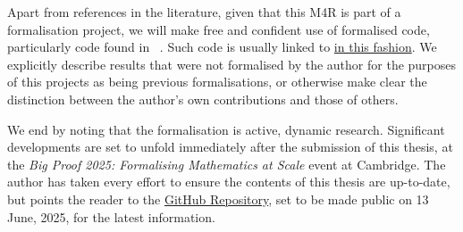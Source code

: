 Apart from references in the literature, given that this M4R is part of a formalisation project, we will make free and confident use of formalised code, particularly code found in \mathlib\ \cite{mathlib}. Such code is usually linked to \href{https://github.com/leanprover-community/mathlib4}{in this fashion}. We explicitly describe results that were not formalised by the author for the purposes of this projects as being previous formalisations, or otherwise make clear the distinction between the author's own contributions and those of others.

We end by noting that the formalisation is active, dynamic research. Significant developments are set to unfold immediately after the submission of this thesis, at the \textit{Big Proof 2025: Formalising Mathematics at Scale} event at Cambridge. The author has taken every effort to ensure the contents of this thesis are up-to-date, but points the reader to the \href{https://github.com/thefundamentaltheor3m/Sphere-Packing-Lean}{GitHub Repository}, set to be made public on 13 June, 2025, for the latest information.

\begin{comment}
    Given the limitations of the M4R assessed project paradigm, the author decided, at the very beginning, to use the first three sections of Viazovska's paper as a black box in order to reduce the number-theoretic burden on what already stood ahead of me as a daunting formalisation task. In particular, the author chose not to make this M4R a number theory project with an element of formalisation but a formalisation project involving ideas from number theory and complex analysis. This conscious but deliberate decision illustrates one of the many advantages of formal theorem proving: modularity with assurances. That is, one need not understand the entirety of a project to contribute to it: one simply needs to understand the parts one is formalising and how to use other ideas and results to one's end. In particular, the fact that the results one is using are formalised provides one with the assurance (that would otherwise only come with expertise) that those results are, indeed, correct. By bearing in mind the subtle yet immensely important fact that this project, at its core, is not a number theory project but a formalisation project, the reader will better understand the expository choices made by the author over the course of this report. There will be less emphasis on the motivations for constructing Viazovska's magic function in this manner (for there exist numerous excellent expository articles that explain this in detail \cite{a few things}) and more emphasis on the formalisation process, with reflections on the successes and failures of the formalisation strategies employed. We underscore insights gleaned from doing this that were not evident in the paper, one one occasion even identifying a small (but negligible) error that was published in the Annals. 
\end{comment}